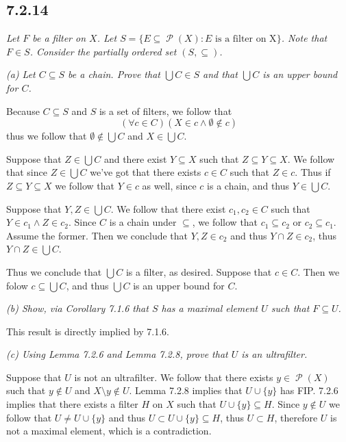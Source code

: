 \documentclass[11pt,oneside,titlepage]{book}
\DeclareMathOperator \pow {\mathcal {P}}
\newcommand{\set}[1]{\{ #1 \}}
\begin{document}
\subsection*{7.2.14}

\textit{Let $F$ be a filter on $X$. Let
  $S = \set{E \subseteq \pow(X): E \text{ is a filter on X}}$. Note that $F \in S$. Consider
  the partially ordered set $(S, \subseteq)$.}

\textit{(a) Let $C \subseteq S$ be a chain. Prove that $\bigcup{C} \in S$ and that
  $\bigcup{C}$ is an upper bound for $C$.}

Because $C \subseteq S$ and $S$ is a set of filters, we follow that
$$(\forall c \in C)(X \in c \land \emptyset \notin c)$$
thus we follow that $\emptyset \notin \bigcup{C}$ and $X \in \bigcup{C}$.

Suppose that $Z \in \bigcup{C}$ and there exist $Y \subseteq X$ such that
$Z \subseteq Y \subseteq X$. We follow that since $Z \in \bigcup{C}$ we've
got that there exists $c \in C$ such that $Z \in c$. Thus if $Z \subseteq Y \subseteq X$
we follow that  $Y \in c$ as well, since $c$ is a chain, and thus $Y \in \bigcup{C}$.

Suppose that $Y, Z \in \bigcup{C}$. We follow that there exist $c_1, c_2 \in C$ such that
$Y \in c_1 \land Z \in c_2$. Since $C$ is a chain under $\subseteq$, we follow that
$c_1 \subseteq c_2$ or $c_2 \subseteq c_1$. Assume the former. Then we conclude that
$Y, Z \in c_2$ and thus $Y \cap Z \in c_2$, thus $Y \cap Z \in \bigcup{C}$.

Thus we conclude that $\bigcup{C}$ is a filter, as desired. Suppose that $c \in C$.
Then we folow $c \subseteq \bigcup{C}$, and thus $\bigcup{C}$ is an upper bound for $C$.

\textit{(b) Show, via Corollary 7.1.6 that $S$ has a maximal
  element $U$ such that $F \subseteq U$.}

This result is directly implied by 7.1.6.

\textit{(c) Using Lemma 7.2.6 and Lemma 7.2.8, prove that $U$ is an ultrafilter.}

Suppose that $U$ is not an ultrafilter. We follow that there exists
$y \in \pow(X)$ such that $y \notin U$ and $X \setminus y \notin U$. Lemma 7.2.8
implies that $U \cup \set{y}$ has FIP. 7.2.6 implies that there exists a filter $H$ on $X$
such that $U \cup \set{y} \subseteq H$. Since $y \notin U$ we follow that
$U \neq U \cup \set{y}$ and thus
$U \subset U \cup \set{y} \subseteq H$, thus $U \subset H$, therefore $U$ is not a maximal element,
which is a contradiction.
\end{document}
